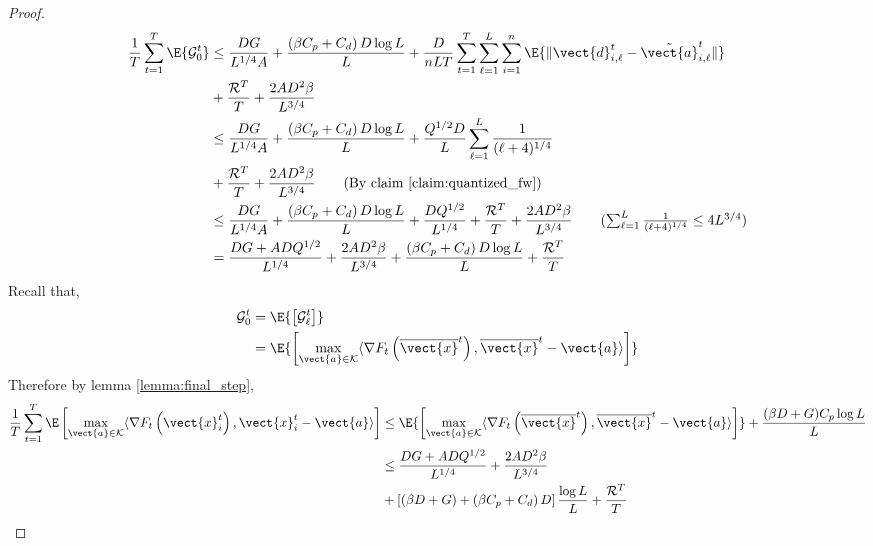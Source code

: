 \begin{proof}
\begin{align*}
    \frac{1}{T}\sum_{t=1}^{T} \E{\mathcal{G}_0^t}
     &\leq \frac{DG}{L^{1/4}A} + \frac{\left(\beta C_p + C_d\right)D \log L }{L} + \frac{D}{nLT} \sum_{t=1}^{T} \sum_{\ell=1}^{L} \sum_{i=1}^{n} \E {\| \vect{d}^t_{i,\ell} - \Tilde{\vect{a}}^{t}_{i, \ell} \|} \\
    &+ \frac{\mathcal{R}^T}{T} + \frac{2AD^2\beta}{L^{3/4}}\\
    &\leq \frac{DG}{L^{1/4}A} + \frac{\left(\beta C_p + C_d\right)D \log L }{L} + \frac{Q^{1/2}D}{L}    \sum_{\ell=1}^{L} \frac{1}{(\ell+4)^{1/4}} \\
    &+ \frac{\mathcal{R}^T}{T} + \frac{2AD^2\beta}{L^{3/4}}
    \tag{By claim \ref{claim:quantized_fw}}\\
    &\leq \frac{DG}{L^{1/4}A} + \frac{\left(\beta C_p + C_d\right)D \log L }{L} + \frac{D Q^{1/2}}{L^{1/4}}  + \frac{\mathcal{R}^T}{T} + \frac{2AD^2\beta}{L^{3/4}}
    \tag{$\sum_{\ell = 1}^{L}\frac{1}{(\ell+4)^{1/4}} \leq 4 L^{3/4}$}\\
    &= \frac{DG + ADQ^{1/2}}{L^{1/4}} + \frac{2AD^2\beta}{L^{3/4}} + \frac{\left(\beta C_p + C_d\right)D \log L }{L}
     + \frac{\mathcal{R}^T}{T}
\end{align*}
Recall that, 
\begin{align*}
    \mathcal{G}_0^t &= \E{ \left[ \mathcal{G}_{\ell}^t \right]} \\
    &= \E{\left[ \max_{\vect{a} \in \mathcal{K}} \langle \nabla F_t\left( \overline{\vect{x}}^t \right), \overline{\vect{x}}^t - \vect{a} \rangle \right]} 
\end{align*}
Therefore by lemma \ref{lemma:final_step}, 
\begin{align*}
    \frac{1}{T} \sum_{t=1}^T \E\left[ \max_{\vect{a} \in \mathcal{K}} \langle \nabla F_t\left( \vect{x}_i^t \right), \vect{x}_i^t - \vect{a} \rangle \right] &\leq \E{\left[ \max_{\vect{a} \in \mathcal{K}} \langle \nabla F_t\left( \overline{\vect{x}}^t \right), \overline{\vect{x}}^t - \vect{a} \rangle \right]} + \frac{(\beta D + G)C_p \log L}{L} \\
    &\leq \frac{DG + ADQ^{1/2}}{L^{1/4}} + \frac{2AD^2\beta}{L^{3/4}} \\
    &+\left[ \left(\beta D + G\right) + \left(\beta C_p + C_d\right)D \right]  \frac{\log L }{L} + \frac{\mathcal{R}^T}{T} 
\end{align*}
\end{proof}
